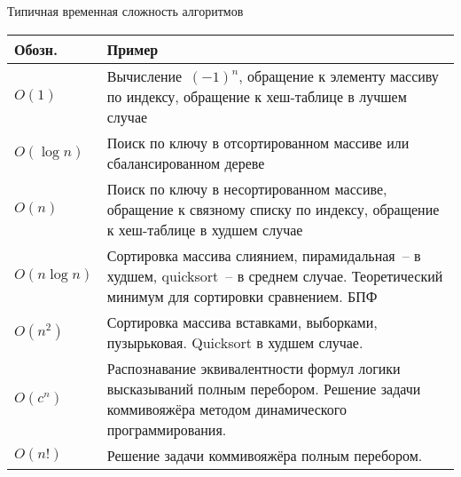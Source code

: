 \documentclass[landscape]{slides}
\begin{document}
\begin{slide}
  Типичная временная сложность алгоритмов
  \begin{center}
    \renewcommand{\arraystretch}{1.3}
    \begin{tabularx}{\textwidth}{|l|X|}
      \hline
      Обозн.&
      Пример
      \\
      \hline
      \hline
      $O(1)$&
      Вычисление~$(-1)^n$, обращение к элементу массиву по индексу, обращение к хеш-таблице в лучшем случае
      \\
      \hline
      $O(\log n)$&
      Поиск по ключу в отсортированном массиве или сбалансированном дереве
      \\
      \hline
      $O(n)$&
      Поиск по ключу в несортированном массиве, обращение к связному списку по индексу, обращение к
      хеш-таблице в худшем случае
      \\
      \hline
      $O(n\log n)$&
      Сортировка массива слиянием, пирамидальная~-- в худшем, quicksort~-- в среднем случае. Теоретический минимум для
      сортировки сравнением. БПФ
      \\
      \hline
      $O(n^2)$&
      Сортировка массива вставками, выборками, пузырьковая. Quicksort в худшем случае.
      \\
      \hline
      $O(c^n)$&
      Распознавание эквивалентности формул логики высказываний полным перебором. Решение задачи коммивояжёра
      методом динамического программирования.
      \\
      \hline
      $O(n!)$&
      Решение задачи коммивояжёра полным перебором.
      \\
      \hline
    \end{tabularx}
  \end{center}
\end{slide}
\end{document}
